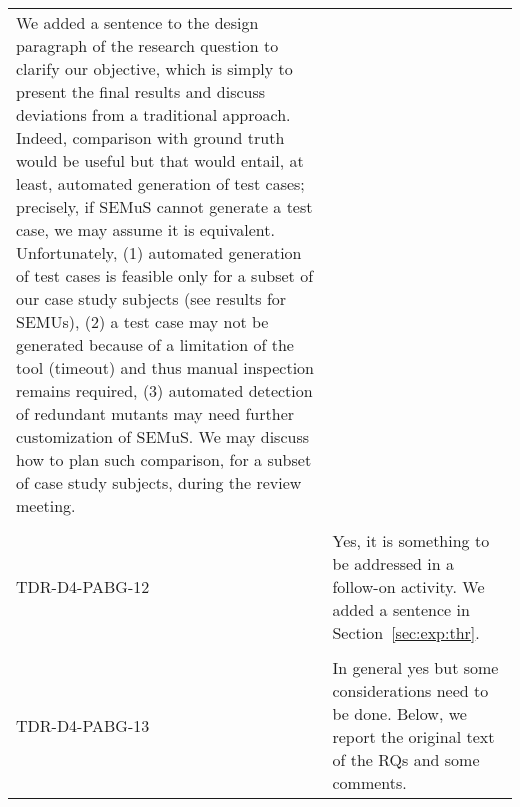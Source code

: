 \begin{longtable}{|p{2cm}|p{12cm}|@{}}
\begin{minipage}{12cm}
We added a sentence to the design paragraph of the research question to clarify our objective, which is simply to present the final results and discuss deviations from a traditional approach. Indeed, comparison with ground truth would be useful but that would entail, at least, automated generation of test cases; precisely, if SEMuS cannot generate a test case, we may assume it is equivalent. Unfortunately, (1) automated generation of test cases is feasible only for a subset of our case study subjects (see results for SEMUs), (2) a test case may not be generated because of a limitation of the tool (timeout) and thus manual inspection remains required, (3) automated detection of redundant mutants may need further customization of SEMuS. We may discuss how to plan such comparison, for a subset of case study subjects,  during the review meeting.
\end{minipage}\\
\\
\hline
TDR-D4-PABG-12&
\begin{minipage}{12cm}
Yes, it is something to be addressed in a follow-on activity. We added a sentence in Section~\ref{sec:exp:thr}.
\end{minipage}\\
\\
\hline
TDR-D4-PABG-13&
\begin{minipage}{12cm}
In general yes but some considerations need to be done. Below, we report the original text of the RQs and some comments.


\end{minipage}
\end{longtable}
